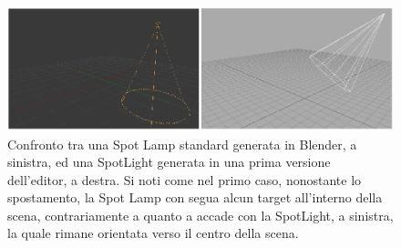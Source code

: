 \begin{figure}[htb]
 \centering
 \includegraphics[width=1\linewidth]{images/chapter_creazione_scena/editor_5.png}\hfill
 \caption[Confronto luci]{Confronto tra una Spot Lamp standard generata in Blender, a sinistra, ed una SpotLight generata in una prima versione dell'editor, a destra. Si noti come nel primo caso, nonostante lo spostamento, la Spot Lamp con segua alcun target all'interno della scena, contrariamente a quanto a accade con la SpotLight, a sinistra, la quale rimane orientata verso il centro della scena.}
 \label{fig:editor_5}
\end{figure} 

